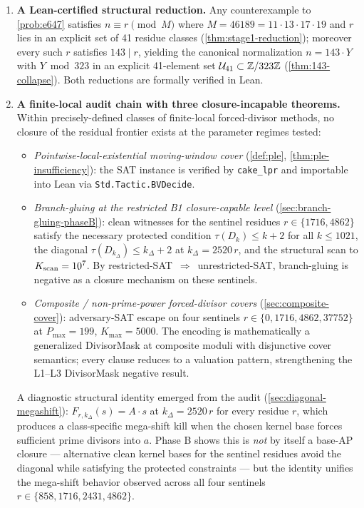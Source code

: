 \begin{enumerate}[leftmargin=*]
\item \textbf{A Lean-certified structural reduction.} Any
counterexample to \cref{prob:e647} satisfies $n \equiv r \pmod M$
where $M = 46189 = 11 \cdot 13 \cdot 17 \cdot 19$ and $r$ lies in an
explicit set of 41 residue classes (\cref{thm:stage1-reduction});
moreover every such $r$ satisfies $143 \mid r$, yielding the
canonical normalization $n = 143 \cdot Y$ with $Y \bmod 323$ in an
explicit 41-element set $\mathcal{U}_{41} \subset \mathbb{Z}/323\mathbb{Z}$
(\cref{thm:143-collapse}). Both reductions are formally verified in
Lean.

\item \textbf{A finite-local audit chain with three closure-incapable
theorems.} Within precisely-defined classes of finite-local
forced-divisor methods, no closure of the residual frontier exists at
the parameter regimes tested:
\begin{itemize}[leftmargin=*]
\item \emph{Pointwise-local-existential moving-window cover}
  (\cref{def:ple}, \cref{thm:ple-insufficiency}): the SAT instance is
  verified by \texttt{cake\_lpr} and importable into Lean via
  \texttt{Std.Tactic.BVDecide}.
\item \emph{Branch-gluing at the restricted B1 closure-capable level}
  (\cref{sec:branch-gluing-phaseB}): clean witnesses for the sentinel
  residues $r \in \{1716, 4862\}$ satisfy the necessary protected
  condition $\tau(D_k) \le k+2$ for all $k \le 1021$, the diagonal
  $\tau(D_{k_\Delta}) \le k_\Delta + 2$ at $k_\Delta = 2520\, r$, and
  the structural scan to $K_{\rm scan} = 10^7$. By
  restricted-SAT~$\Rightarrow$~unrestricted-SAT, branch-gluing is
  negative as a closure mechanism on these sentinels.
\item \emph{Composite / non-prime-power forced-divisor covers}
  (\cref{sec:composite-cover}): adversary-SAT escape on four sentinels
  $r \in \{0, 1716, 4862, 37752\}$ at $P_{\max} = 199$,
  $K_{\max} = 5000$. The encoding is mathematically a generalized
  DivisorMask at composite moduli with disjunctive cover semantics;
  every clause reduces to a valuation pattern, strengthening the
  L1--L3 DivisorMask negative result.
\end{itemize}
A diagnostic structural identity emerged from the audit
(\cref{sec:diagonal-megashift}): $F_{r, k_\Delta}(s) = A \cdot s$ at
$k_\Delta = 2520\, r$ for every residue $r$, which produces a
class-specific mega-shift kill when the chosen kernel base forces
sufficient prime divisors into $a$. Phase B shows this is
\emph{not} by itself a base-AP closure --- alternative clean kernel
bases for the sentinel residues avoid the diagonal while satisfying
the protected constraints --- but the identity unifies the
mega-shift behavior observed across all four sentinels
$r \in \{858, 1716, 2431, 4862\}$.


\end{enumerate}
